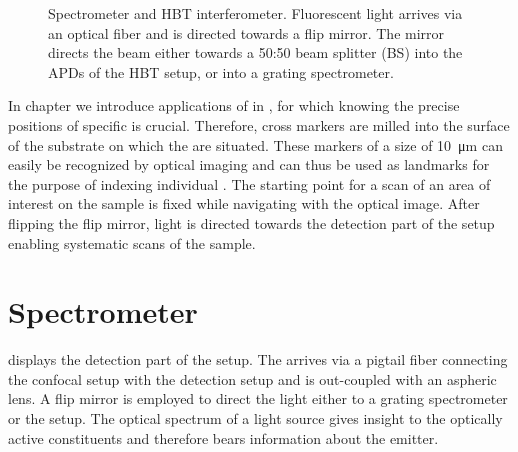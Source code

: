 		\begin{figure}[!htb]
			\centering
			\caption[Spectrometer and HBT setup]{Spectrometer and HBT interferometer. Fluorescent light arrives via an optical fiber and is directed towards a flip mirror. The mirror directs the beam either towards a 50:50 beam splitter (BS) into the APDs of the HBT setup, or into a grating spectrometer.}
			\label{fig::hbt_spectrometer}
		\end{figure}

		In chapter  we introduce applications of \sivs in \nds, for which knowing the precise positions of specific \nds is crucial.
		Therefore, cross markers are milled into the surface of the substrate on which the \nds are situated.
		These markers of a size of \SI{10}{\micro\meter} can easily be recognized by optical imaging and can thus be used as landmarks for the purpose of indexing individual \sivs.
		The starting point for a scan of an area of interest on the sample is fixed while navigating with the optical image.
		After flipping the flip mirror, light is directed towards the detection part of the setup enabling systematic scans of the sample.

	\section{Spectrometer} \label{sec::methods_spectrometer}

		 displays the detection part of the setup.
		The \fl arrives via a pigtail fiber connecting the confocal setup with the detection setup and is out-coupled with an aspheric lens.
		A flip mirror is employed to direct the light either to a grating spectrometer or the \hbt setup.
		The optical spectrum of a light source gives insight to the optically active constituents and therefore bears information about the emitter.

